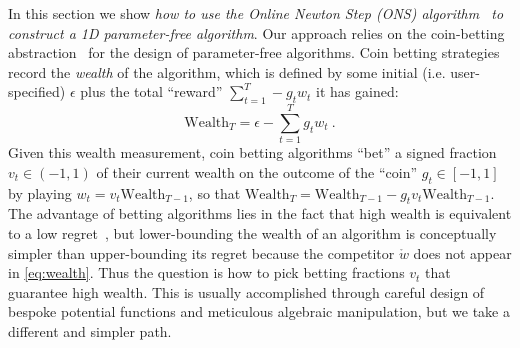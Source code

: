 \documentclass[12pt]{colt2018} %
\newcommand{\wealth}{\text{Wealth}}
\newcommand{\w}{\mathring{w}}
\begin{document}
In this section we show \emph{how to use the Online Newton Step (ONS) algorithm~\citep{hazan2007logarithmic} to construct a 1D parameter-free algorithm}. Our approach relies on the coin-betting abstraction~\citep{orabona2016coin} for the design of parameter-free algorithms. Coin betting strategies record the \emph{wealth} of the algorithm, which is defined by some initial (i.e. user-specified) $\epsilon$ plus the total ``reward'' $\sum_{t=1}^T-g_tw_t$ it has gained:
\begin{equation}
\label{eq:wealth}
\wealth_T=\epsilon-\sum_{t=1}^T g_tw_t~.
\end{equation}
Given this wealth measurement, coin betting algorithms ``bet'' a signed fraction $v_t\in(-1,1)$ of their current wealth on the outcome of the ``coin'' $g_t \in [-1,1]$ by playing $w_{t}=v_t\wealth_{T-1}$, so that $\wealth_T = \wealth_{T-1} - g_t v_t\wealth_{T-1}$. The advantage of betting algorithms lies in the fact that high wealth is equivalent to a low regret~\cite{mcmahan2014unconstrained}, but lower-bounding the wealth of an algorithm is conceptually simpler than upper-bounding its regret because the competitor $\w$ does not appear in \eqref{eq:wealth}. Thus the question is how to pick betting fractions $v_t$ that guarantee high wealth. This is usually accomplished through careful design of bespoke potential functions and meticulous algebraic manipulation, but we take a different and simpler path.
\end{document}
